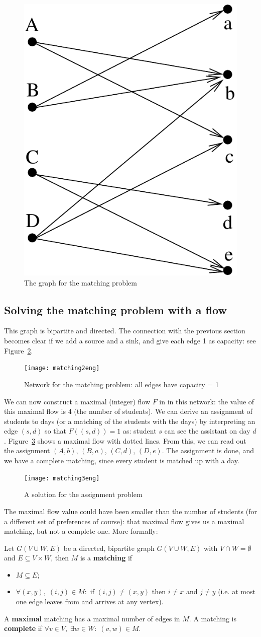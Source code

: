 \begin{figure}[ht]
	\centering
	\includegraphics[width=0.17\linewidth,keepaspectratio]{matching1} %
	\caption{The graph for the matching problem\label{matching1}}
\end{figure}

\subsection{Solving the matching problem with a flow}
This graph is bipartite and directed. The connection with the previous
section becomes clear if we add a source and a sink, and give each
edge 1 as capacity: see Figure~\ref{matching2}.

\begin{figure}[ht]
	\centering
	\texttt{[image: matching2eng]} %
	\caption{Network for the matching problem: all edges have capacity = 1\label{matching2}}
\end{figure}

We can now construct a maximal (integer) flow $F$ in in this network:
the value of this maximal flow is 4 (the number of students). We can
derive an assignment of students to days (or a matching of the
students with the days) by interpreting an edge $(s,d)$ so that
$F((s,d)) = 1$ as: student $s$ can see the assistant on day
$d$. Figure~\ref{matching3} shows a maximal flow with dotted lines. From this, we
can read out the assignment $(A,b)$, $(B,a)$, $(C,d)$,
$(D,e)$. The assignment is done, and we have a complete matching, since every student is matched up with a day.

\begin{figure}[ht]
	\centering
	\texttt{[image: matching3eng]} %
	\caption{A solution for the assignment problem\label{matching3}}
\end{figure}

The maximal flow value could have been smaller than the number of
students (for a different set of preferences of course): that maximal
flow gives us a maximal matching, but not a complete one. More
formally:


\begin{definition}
	{\rm Let $G(V \cup W,E)$ be a directed, bipartite graph $G(V \cup
	W,E)$ with $V \cap W = \emptyset$ and $E \subseteq V \times W$, then
	$M$ is a \textbf{matching} if
	\begin{itemize}
		\item $M \subseteq E$;
		\item $\forall (x,y),\;(i,j) \in M:$ if $(i,j) \neq (x,y)$ then $i \neq x$ and $j \neq y$ (i.e. at most one edge leaves from and arrives at any vertex).
	\end{itemize}
	A \textbf{maximal} matching has a maximal number of edges in $M$. A
	matching is \textbf{complete} if $\forall v \in V,\; \exists w\in W:\;
	(v,w) \in M$.  }
\end{definition}

